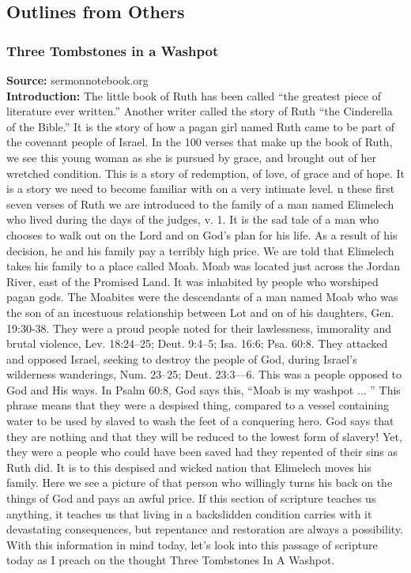 \subsection{Outlines from Others}

\subsubsection{Three Tombstones in a Washpot}
\textbf{Source: }sermonnotebook.org\\
\textbf{Introduction: }The little book of Ruth has been called ``the greatest piece of literature ever written.'' Another writer called the story of Ruth ``the Cinderella of the Bible.'' It is the story of how a pagan girl named Ruth came to be part of the covenant people of Israel. In the 100 verses that make up the book of Ruth, we see this young woman as she is pursued by grace, and brought out of her wretched condition. This is a story of redemption, of love, of grace and of hope. It is a story we need to become familiar with on a very intimate level.  n these first seven verses of Ruth we are introduced to the family of a man named Elimelech who lived during the days of the judges, v. 1. It is the sad tale of a man who chooses to walk out on the Lord and on God's plan for his life. As a result of his decision, he and his family pay a terribly high price. We are told that Elimelech takes his family to a place called Moab. Moab was located just across the Jordan River, east of the Promised Land. It was inhabited by people who worshiped pagan gods. The Moabites were the descendants of a man named Moab who was the son of an incestuous relationship between Lot and on of his daughters, Gen. 19:30-38. They were a proud people noted for their lawlessness, immorality and brutal violence, Lev. 18:24--25; Deut. 9:4--5; Isa. 16:6; Psa. 60:8. They attacked and opposed Israel, seeking to destroy the people of God, during Israel's wilderness wanderings, Num. 23--25; Deut. 23:3---6. This was a people opposed to God and His ways. In Psalm 60:8, God says this, ``Moab is my washpot $\hdots$ '' This phrase means that they were a despised thing, compared to a vessel containing water to be used by slaved to wash the feet of a conquering hero. God says that they are nothing and that they will be reduced to the lowest form of slavery! Yet, they were a people who could have been saved had they repented of their sins as Ruth did. It is to this despised and wicked nation that Elimelech moves his family. Here we see a picture of that person who willingly turns his back on the things of God and pays an awful price. If this section of scripture teaches us anything, it teaches us that living in a backslidden condition carries with it devastating consequences, but repentance and restoration are always a possibility. With this information in mind today, let's look into this passage of scripture today as I preach on the thought Three Tombstones In A Washpot.
